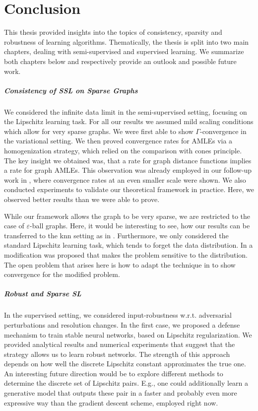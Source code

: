 \chapter{Conclusion}\label{ch:C}
%
%
This thesis provided insights into the topics of consistency, sparsity and robustness of learning algorithms. Thematically, the thesis is split into two main chapters, dealing with semi-supervised and supervised learning. We summarize both chapters below and respectively provide an outlook and possible future work.

\paragraph{Consistency of SSL on Sparse Graphs} We considered the infinite data limit in the semi-supervised setting, focusing on the Lipschitz learning task. For all our results we assumed mild scaling conditions which allow for very sparse graphs. We were first able to show $\Gamma$-convergence in the variational setting. We then proved convergence rates for AMLEs via a homogenization strategy, which relied on the comparison with cones principle. The key insight we obtained was, that a rate for graph distance functions implies a rate for graph AMLEs. This observation was already employed in our follow-up work in \cite{bungert2022ratio}, where convergence rates at an even smaller scale were shown. We also conducted experiments to validate our theoretical framework in practice. Here, we observed better results than we were able to prove. 

While our framework allows the graph to be very sparse, we are restricted to the case of $\varepsilon$-ball graphs. Here, it would be interesting to see, how our results can be transferred to the knn setting as in \cite{calder2022improved}. Furthermore, we only considered the standard Lipschitz learning task, which tends to forget the data distribution. In \cite{calder2019consistency} a modification was proposed that makes the problem sensitive to the distribution. The open problem that arises here is how to adapt the technique in \cite{bungert2021uniform} to show convergence for the modified problem.\par

\paragraph{Robust and Sparse SL} In the supervised setting, we considered input-robustness w.r.t. adversarial perturbations and resolution changes. In the first case, we proposed a defense mechanism to train stable neural networks, based on Lipschitz regularization. We provided analytical results and numerical experiments that suggest that the strategy allows us to learn robust networks. The strength of this approach depends on how well the discrete Lipschitz constant approximates the true one. An interesting future direction would be to explore different methods to determine the discrete set of Lipschitz pairs. E.g., one could additionally learn a generative model that outputs these pair in a faster and probably even more expressive way than the gradient descent scheme, employed right now.

